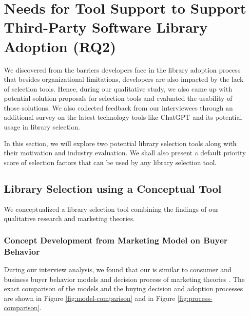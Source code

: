 

\section{Needs for Tool Support to Support Third-Party Software Library Adoption (RQ2)}
We discovered from the barriers developers face in the library adoption process that besides organizational limitations, developers are also impacted by the lack of selection tools. Hence, during our qualitative study, we also came up with potential solution proposals for selection tools and evaluated the usability of those solutions. We also collected feedback from our interviewees through an additional survey on the latest technology tools like ChatGPT and its potential usage in library selection.

In this section, we will explore two potential library selection tools along with their motivation and industry evaluation. We shall also present a default priority score of selection factors that can be used by any library selection tool.

\subsection{Library Selection using a Conceptual Tool}
We conceptualized a library selection tool combining the findings of our qualitative research and marketing theories.
\subsubsection{Concept Development from Marketing Model on Buyer Behavior}
During our interview analysis, we found that our \model\space is similar to consumer and business buyer behavior models and decision process of marketing theories \cite{kotler2014principles}. The exact comparison of the models and the buying decision and adoption processes are shown in Figure \ref{fig:model-comparison} and in Figure \ref{fig:process-comparison}.


